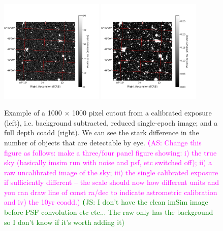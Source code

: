 \documentclass[twocolumn]{aastex62}
\newcommand{\as}[1]{{\textcolor{magenta}{{\textbf (AS: #1)}}}}
\newcommand{\js}[1]{{\textcolor{green}{{\textbf (JS: #1)}}}}
\begin{document}
\begin{figure}
\centering
\includegraphics[width=0.44\textwidth]{calexp_example.png}
\includegraphics[width=0.44\textwidth]{coadd_example.png}
\caption{Example of a 1000 $\times$ 1000 pixel cutout from a calibrated exposure (left), i.e. background subtracted, reduced single-epoch image; and a full depth coadd (right). We can see the stark difference in the number of objects that are detectable by eye.
\as{Change this figure as follows: make a three/four panel figure showing: i) the true sky (basically imsim run with noise and psf, etc switched off); ii) a raw uncalibrated image of the sky; iii) the single calibrated exposure if sufficiently different -- the scale should now how different units and you can draw line of const ra/dec to indicate astrometric calibration and iv) the 10yr coadd.} \js{I don't have the clean imSim image before PSF convolution etc etc... The raw only has the background so I don't know if it's worth adding it}}
\label{fig:coadd_example}
\end{figure}
\end{document}
